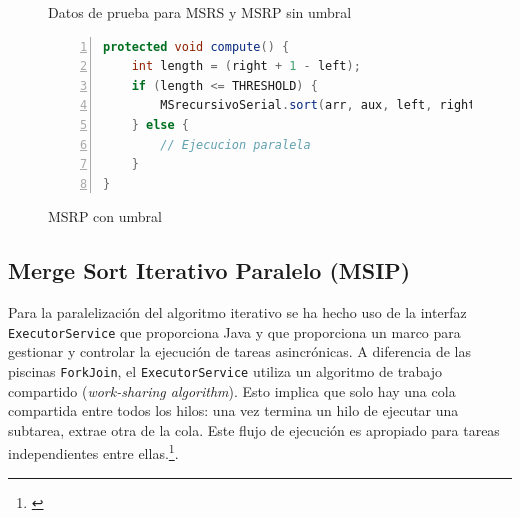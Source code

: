 \documentclass[titlepage]{article}
\begin{document}
\begin{figure}
	\centering
	\caption{Datos de prueba para MSRS y MSRP sin umbral} 
	\label{fig:testPilotoMSRP}
\end{figure}

\begin{figure}[h]
	\begin{lstlisting}[language=java, frame=single, numbers=left]
protected void compute() {
	int length = (right + 1 - left);
	if (length <= THRESHOLD) {
		MSrecursivoSerial.sort(arr, aux, left, right);
	} else {
		// Ejecucion paralela
	}
}
	\end{lstlisting}
	\caption{MSRP con umbral}
	\label{fig:computeModificado}
\end{figure}

\newpage
\subsection{Merge Sort Iterativo Paralelo (MSIP)}
Para la paralelización del algoritmo iterativo se ha hecho uso de la interfaz \lstinline{ExecutorService} que proporciona Java y que proporciona un marco para gestionar y controlar la ejecución de tareas asincrónicas. A diferencia de las piscinas \lstinline{ForkJoin}, el \lstinline{ExecutorService} utiliza un algoritmo de trabajo compartido (\textit{work-sharing algorithm}). Esto implica que solo hay una cola compartida entre todos los hilos: una vez termina un hilo de ejecutar una subtarea, extrae otra de la cola. Este flujo de ejecución es apropiado para tareas independientes entre ellas.\footnote{\cite{OracleExecutorService}}.
\end{document}

